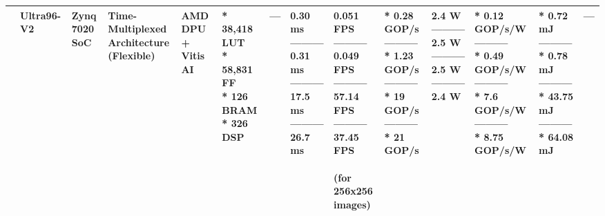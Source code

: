 \begin{center}
{\begin{tabular}{llllllllllllll}
\cite{cratereEfficientFPGAacceleratedConvolutional2024} & Ultra96-V2 & \makecell[tl]{Zynq\\ 7020 SoC} & \makecell[tl]{Time-Multiplexed\\ Architecture\\ (Flexible)} & \makecell[tl]{AMD DPU + \\Vitis AI} & \makecell[tl]{* 38,418 LUT\\ * 58,831 FF\\ * 126 BRAM\\ * 326 DSP} & --- & \makecell[tl]{0.30 ms\\ ---------\\ 0.31 ms\\ ---------\\ 17.5 ms\\ ---------\\ 26.7 ms} & \makecell[tl]{0.051 FPS\\ ---------\\ 0.049 FPS\\ ---------\\ 57.14 FPS\\ ---------\\ 37.45 FPS\\ \\ (for 256x256\\ images)} & \makecell[tl]{* 0.28 GOP/s\\ ---------\\ * 1.23 GOP/s\\ ---------\\ * 19 GOP/s\\ ---------\\ * 21 GOP/s} & \makecell[tl]{2.4 W\\ ---------\\ 2.5 W\\ ---------\\ 2.5 W\\ ---------\\ 2.4 W} & \makecell[tl]{* 0.12 GOP/s/W\\ ---------\\ * 0.49 GOP/s/W\\ ---------\\ * 7.6 GOP/s/W\\ ---------\\ * 8.75 GOP/s/W} & \makecell[tl]{* 0.72 mJ\\ ---------\\ * 0.78 mJ\\ ---------\\ * 43.75 mJ\\ ---------\\ * 64.08 mJ} & --- \\ \hline

\end{tabular}}
\end{center}

